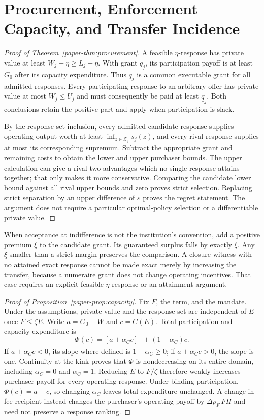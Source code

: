 \section{Procurement, Enforcement Capacity, and Transfer Incidence}
\begin{proof}[Proof of Theorem~\ref{paper-thm:procurement}]
A feasible $\eta$-response has private value at least $W_j-\eta\geq L_j-\eta$. With grant $\overline q_j$, its participation payoff is at least $G_0$ after its capacity expenditure. Thus $\overline q_j$ is a common executable grant for all admitted responses. Every participating response to an arbitrary offer has private value at most $W_j\leq U_j$ and must consequently be paid at least $\underline q_j$. Both conclusions retain the positive part and apply when participation is slack.

By the response-set inclusion, every admitted candidate response supplies operating output worth at least $\inf_{z\in\mathcal Z_j}s_j(z)$, and every rival response supplies at most its corresponding supremum. Subtract the appropriate grant and remaining costs to obtain the lower and upper purchaser bounds. The upper calculation can give a rival two advantages which no single response attains together; that only makes it more conservative. Comparing the candidate lower bound against all rival upper bounds and zero proves strict selection. Replacing strict separation by an upper difference of $\varepsilon$ proves the regret statement. The argument does not require a particular optimal-policy selection or a differentiable private value.
\end{proof}

When acceptance at indifference is not the institution's convention, add a positive premium $\xi$ to the candidate grant. Its guaranteed surplus falls by exactly $\xi$. Any $\xi$ smaller than a strict margin preserves the comparison. A closure witness with no attained exact response cannot be made exact merely by increasing the transfer, because a numeraire grant does not change operating incentives. That case requires an explicit feasible $\eta$-response or an attainment argument.

\begin{proof}[Proof of Proposition~\ref{paper-prop:capacity}]
Fix $F$, the term, and the mandate. Under the assumptions, private value and the response set are independent of $E$ once $F\leq\zeta E$. Write $a=G_0-W$ and $c=C(E)$. Total participation and capacity expenditure is
\[
 \Phi(c)=[a+\alpha_C c]_++(1-\alpha_C)c.
\]
If $a+\alpha_Cc<0$, its slope where defined is $1-\alpha_C\geq0$; if $a+\alpha_Cc>0$, the slope is one. Continuity at the kink proves that $\Phi$ is nondecreasing on its entire domain, including $\alpha_C=0$ and $\alpha_C=1$. Reducing $E$ to $F/\zeta$ therefore weakly increases purchaser payoff for every operating response. Under binding participation, $\Phi(c)=a+c$, so changing $\alpha_C$ leaves total expenditure unchanged. A change in fee recipient instead changes the purchaser's operating payoff by $\Delta\rho_F\,FH$ and need not preserve a response ranking.
\end{proof}

